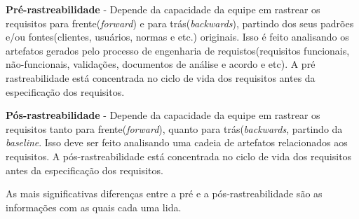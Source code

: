 \textbf{Pré-rastreabilidade} - Depende da capacidade da equipe em rastrear os requisitos para frente(\textit{forward}) e para trás(\textit{backwards}), partindo dos seus padrões e/ou fontes(clientes, usuários, normas e etc.) originais. Isso é feito analisando os artefatos gerados pelo processo de engenharia de requistos(requisitos funcionais, não-funcionais, validações, documentos de análise e acordo e etc). A pré rastreabilidade está concentrada no ciclo de vida dos requisitos antes da especificação dos requisitos.

\textbf{Pós-rastreabilidade} - Depende da capacidade da equipe em rastrear os requisitos tanto para frente(\textit{forward}), quanto para trás(\textit{backwards}, partindo da \textit{baseline}. Isso deve ser feito analisando uma cadeia de artefatos relacionados aos requisitos. A pós-rastreabilidade está concentrada no ciclo de vida dos requisitos antes da especificação dos requisitos.

As mais significativas diferenças entre a pré e a pós-rastreabilidade são as informações com as quais cada uma lida.
